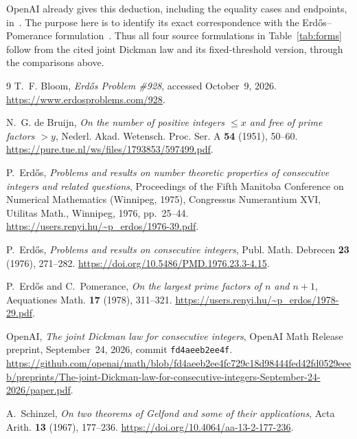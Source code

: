 \documentclass[11pt,a4paper]{amsart}
\begin{document}
OpenAI already gives this deduction, including the equality cases and
endpoints, in~\cite[(11.8) and following paragraph, p.~80]{OpenAI2026}.
The purpose here is to identify its exact correspondence with the
Erd\H{o}s--Pomerance formulation~\cite{ErdosPomerance1978}. Thus all four
source formulations in Table~\ref{tab:forms} follow from the cited
joint Dickman law and its fixed-threshold version, through the
comparisons above.

\begin{thebibliography}{9}
T.~F. Bloom, \emph{Erd\H{o}s Problem \#928},
accessed October~9, 2026.
\newline\url{https://www.erdosproblems.com/928}.

N.~G. de Bruijn, \emph{On the number of positive integers $\le x$ and
free of prime factors $>y$}, Nederl. Akad. Wetensch. Proc. Ser. A
\textbf{54} (1951), 50--60.
\newline\url{https://pure.tue.nl/ws/files/1793853/597499.pdf}.

P.~Erd\H{o}s, \emph{Problems and results on number theoretic properties of
consecutive integers and related questions}, Proceedings of the Fifth
Manitoba Conference on Numerical Mathematics (Winnipeg, 1975), Congressus
Numerantium XVI, Utilitas Math., Winnipeg, 1976, pp.~25--44.
\newline\url{https://users.renyi.hu/~p_erdos/1976-39.pdf}.

P.~Erd\H{o}s, \emph{Problems and results on consecutive integers}, Publ.
Math. Debrecen \textbf{23} (1976), 271--282.
\newline\url{https://doi.org/10.5486/PMD.1976.23.3-4.15}.

P.~Erd\H{o}s and C.~Pomerance, \emph{On the largest prime factors of $n$
and $n+1$}, Aequationes Math. \textbf{17} (1978), 311--321.
\newline\url{https://users.renyi.hu/~p_erdos/1978-29.pdf}.

OpenAI, \emph{The joint Dickman law for consecutive integers}, OpenAI
Math Release preprint, September~24, 2026, commit
\texttt{fd4aeeb2ee4f}.
\newline\url{https://github.com/openai/math/blob/fd4aeeb2ee4fc729c18d98444fed42fd0529eeeb/preprints/The-joint-Dickman-law-for-consecutive-integers-September-24-2026/paper.pdf}.

A.~Schinzel, \emph{On two theorems of Gelfond and some of their
applications}, Acta Arith. \textbf{13} (1967), 177--236.
\newline\url{https://doi.org/10.4064/aa-13-2-177-236}.
\end{thebibliography}
\end{document}
